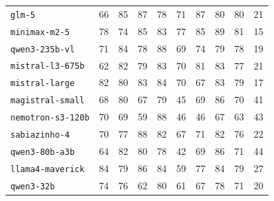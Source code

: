 \documentclass{IOS-Book-Article}
\begin{document}
\begin{table}[!ht]
\begin{tabular}{llrrrrrrrr}
\texttt{glm-5} & 66 & 85 & 87 & 78 & 71 & 87 & 80 & 80 & 21 \\
\texttt{minimax-m2-5} & 78 & 74 & 85 & 83 & 77 & 85 & 89 & 81 & 15 \\
\texttt{qwen3-235b-vl} & 71 & 84 & 78 & 88 & 69 & 74 & 79 & 78 & 19 \\
\texttt{mistral-l3-675b} & 62 & 82 & 79 & 83 & 70 & 81 & 83 & 77 & 21 \\
\texttt{mistral-large} & 82 & 80 & 83 & 84 & 70 & 67 & 83 & 79 & 17 \\
\texttt{magistral-small} & 68 & 80 & 67 & 79 & 45 & 69 & 86 & 70 & 41 \\
\texttt{nemotron-s3-120b} & 70 & 69 & 59 & 88 & 46 & 46 & 67 & 63 & 43 \\
\texttt{sabiazinho-4} & 70 & 77 & 88 & 82 & 67 & 71 & 82 & 76 & 22 \\
\texttt{qwen3-80b-a3b} & 64 & 82 & 80 & 78 & 42 & 69 & 86 & 71 & 44 \\
\texttt{llama4-maverick} & 84 & 79 & 86 & 84 & 59 & 77 & 84 & 79 & 27 \\
\texttt{qwen3-32b} & 74 & 76 & 62 & 80 & 61 & 67 & 78 & 71 & 20 \\
\hline
\end{tabular}
\end{table}
\end{document}
